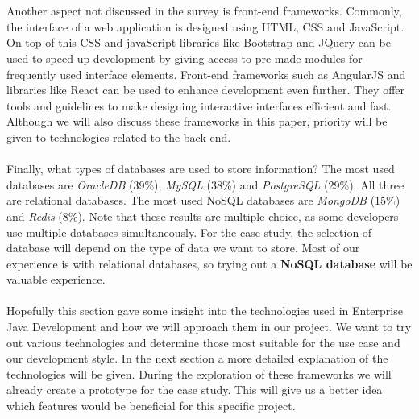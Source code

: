 \documentclass[12pt]{article}
\begin{document}
\begin{multicols}{2}
\\\\
Another aspect not discussed in the survey is front-end frameworks. Commonly, the interface of a web application is designed using HTML, CSS and JavaScript. On top of this CSS and javaScript libraries like Bootstrap and JQuery can be used to speed up development by giving access to pre-made modules for frequently used interface elements. Front-end frameworks such as AngularJS and libraries like React can be used to enhance development even further. They offer tools and guidelines to make designing interactive interfaces efficient and fast. Although we will also discuss these frameworks in this paper, priority will be given to technologies related to the back-end.
\\\\
Finally, what types of databases are used to store information? The most used databases are \textit{OracleDB} (39\%), \textit{MySQL} (38\%) and \textit{PostgreSQL} (29\%). All three are relational databases. The most used NoSQL databases are \textit{MongoDB} (15\%) and \textit{Redis} (8\%). Note that these results are multiple choice, as some developers use multiple databases simultaneously. For the case study, the selection of database will depend on the type of data we want to store. Most of our experience is with relational databases, so trying out a \textbf{NoSQL database} will be valuable experience.
\\\\
Hopefully this section gave some insight into the technologies used in Enterprise Java Development and how we will approach them in our project. We want to try out various technologies and determine those most suitable for the use case and our development style. In the next section a more detailed explanation of the technologies will be given. During the exploration of these frameworks we will already create a prototype for the case study. This will give us a better idea which features would be beneficial for this specific project.



\end{multicols}
\end{document}

